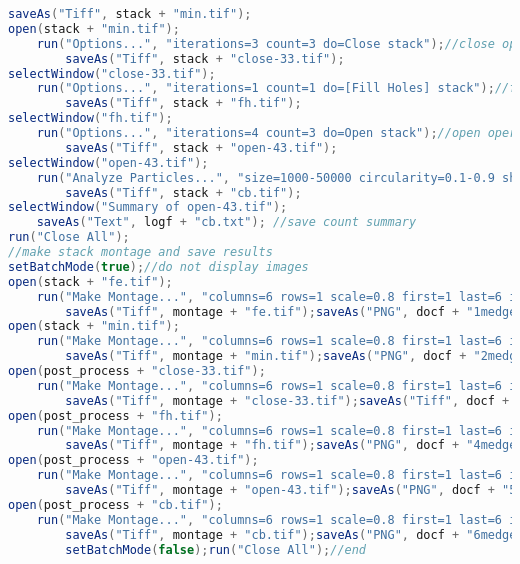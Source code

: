 \begin{lstlisting}[language=java, caption=Segmentation by edge detection., label=cd:segment-edge]
    	saveAs("Tiff", stack + "min.tif");
open(stack + "min.tif");
	run("Options...", "iterations=3 count=3 do=Close stack");//close operator
		saveAs("Tiff", stack + "close-33.tif");
selectWindow("close-33.tif");
	run("Options...", "iterations=1 count=1 do=[Fill Holes] stack");//fill holes
		saveAs("Tiff", stack + "fh.tif");
selectWindow("fh.tif");
	run("Options...", "iterations=4 count=3 do=Open stack");//open operator
		saveAs("Tiff", stack + "open-43.tif");
selectWindow("open-43.tif");
	run("Analyze Particles...", "size=1000-50000 circularity=0.1-0.9 show=Outlines display clear summarize in_situ stack"); //particle count
		saveAs("Tiff", stack + "cb.tif");
selectWindow("Summary of open-43.tif"); 
	saveAs("Text", logf + "cb.txt"); //save count summary
run("Close All");
//make stack montage and save results
setBatchMode(true);//do not display images
open(stack + "fe.tif");
	run("Make Montage...", "columns=6 rows=1 scale=0.8 first=1 last=6 increment=1 border=4 font=20 label");
		saveAs("Tiff", montage + "fe.tif");saveAs("PNG", docf + "1medge.png");
open(stack + "min.tif");
	run("Make Montage...", "columns=6 rows=1 scale=0.8 first=1 last=6 increment=1 border=4 font=20 label");
		saveAs("Tiff", montage + "min.tif");saveAs("PNG", docf + "2medge-b.png");
open(post_process + "close-33.tif");
	run("Make Montage...", "columns=6 rows=1 scale=0.8 first=1 last=6 increment=1 border=4 font=20 label use");
		saveAs("Tiff", montage + "close-33.tif");saveAs("Tiff", docf + "3medge-close.png");
open(post_process + "fh.tif"); 
	run("Make Montage...", "columns=6 rows=1 scale=0.8 first=1 last=6 increment=1 border=4 font=20 label use");
		saveAs("Tiff", montage + "fh.tif");saveAs("PNG", docf + "4medge-fh.png");
open(post_process + "open-43.tif"); 
	run("Make Montage...", "columns=6 rows=1 scale=0.8 first=1 last=6 increment=1 border=4 font=20 label use");
		saveAs("Tiff", montage + "open-43.tif");saveAs("PNG", docf + "5medge-open.png");
open(post_process + "cb.tif"); 
	run("Make Montage...", "columns=6 rows=1 scale=0.8 first=1 last=6 increment=1 border=4 font=20 label use");
		saveAs("Tiff", montage + "cb.tif");saveAs("PNG", docf + "6medge-cb.png");
		setBatchMode(false);run("Close All");//end
		\end{lstlisting}

